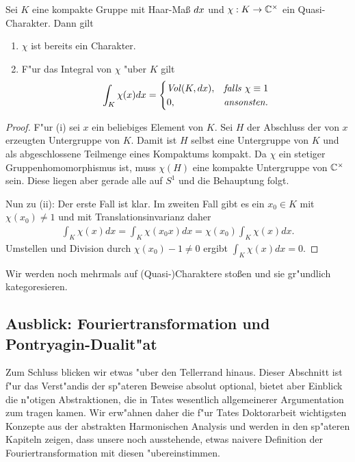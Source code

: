 	\begin{lemma}\label{Lemma:trivialerCharAufKompakt}
		Sei $K$ eine kompakte Gruppe mit Haar-Maß $d{x}$ und $\chi: K \to \mathbb{C}^\times$ ein Quasi-Charakter. Dann gilt
		\begin{enumerate}[label=\emph{(\roman*)}]
				\item $\chi$ ist bereits ein Charakter.
				\item F"ur das Integral von $\chi$ "uber $K$ gilt
					\begin{align*}
						\int_K \chi(x) d{x} = 
							\begin{cases}
								\text{\emph{Vol}}(K, d{x}),	& \text{\emph{falls} } \chi\equiv 1\\
								0,					& \text{\emph{ansonsten.}}
							\end{cases}
					\end{align*}
		\end{enumerate}
	\end{lemma}
	\begin{proof}
		F"ur (i) sei $x$ ein beliebiges Element von $K$. 
		Sei $H$ der Abschluss der von $x$ erzeugten Untergruppe von $K$.
		Damit ist $H$ selbst eine Untergruppe von $K$ und als abgeschlossene Teilmenge eines Kompaktums kompakt.
		Da $\chi$ ein stetiger Gruppenhomomorphismus ist, muss $\chi(H)$ eine kompakte Untergruppe von $\mathbb{C}^\times$ sein.
		Diese liegen aber gerade alle auf $S^1$ und die Behauptung folgt.
		
		Nun zu (ii): Der erste Fall ist klar. 
		Im zweiten Fall gibt es ein $x_0 \in K$ mit $\chi(x_0) \not=1$ und mit Translationsinvarianz daher
		\begin{align*}
			\int_K \chi(x)dx = \int_K\chi(x_0x)dx = \chi(x_0)\int_K\chi(x)dx.
		\end{align*}
		Umstellen und Division durch $\chi(x_0) - 1 \not=0$ ergibt $\int_K \chi(x)dx = 0$.
	\end{proof}
	Wir werden noch mehrmals auf (Quasi-)Charaktere stoßen und sie gr"undlich kategoresieren.
	
\subsection{Ausblick: Fouriertransformation und Pontryagin-Dualit"at}
	Zum Schluss blicken wir etwas "uber den Tellerrand hinaus.
	Dieser Abschnitt ist f"ur das Verst"andis der sp"ateren Beweise absolut optional, bietet aber Einblick die n"otigen Abstraktionen, die in Tates wesentlich allgemeinerer Argumentation zum tragen kamen.
	Wir erw"ahnen daher die f"ur Tates Doktorarbeit wichtigsten Konzepte aus der abstrakten Harmonischen Analysis und werden in den sp"ateren Kapiteln zeigen, dass unsere noch ausstehende, etwas naivere Definition der Fouriertransformation mit diesen "ubereinstimmen.
	
